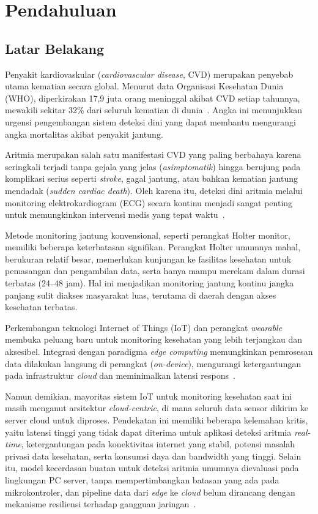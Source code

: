 \chapter{Pendahuluan}
\label{chap:pendahuluan}

\section{Latar Belakang}
\label{sec:latar-belakang}

Penyakit kardiovaskular (\textit{cardiovascular disease}, CVD) merupakan penyebab utama kematian secara global. Menurut data Organisasi Kesehatan Dunia (WHO), diperkirakan 17,9 juta orang meninggal akibat CVD setiap tahunnya, mewakili sekitar 32\% dari seluruh kematian di dunia~\cite{who_cvd}. Angka ini menunjukkan urgensi pengembangan sistem deteksi dini yang dapat membantu mengurangi angka mortalitas akibat penyakit jantung.

Aritmia merupakan salah satu manifestasi CVD yang paling berbahaya karena seringkali terjadi tanpa gejala yang jelas (\textit{asimptomatik}) hingga berujung pada komplikasi serius seperti \textit{stroke}, gagal jantung, atau bahkan kematian jantung mendadak (\textit{sudden cardiac death}). Oleh karena itu, deteksi dini aritmia melalui monitoring elektrokardiogram (ECG) secara kontinu menjadi sangat penting untuk memungkinkan intervensi medis yang tepat waktu~\cite{sheeba_rani_2026}.

Metode monitoring jantung konvensional, seperti perangkat Holter monitor, memiliki beberapa keterbatasan signifikan. Perangkat Holter umumnya mahal, berukuran relatif besar, memerlukan kunjungan ke fasilitas kesehatan untuk pemasangan dan pengambilan data, serta hanya mampu merekam dalam durasi terbatas (24--48 jam). Hal ini menjadikan monitoring jantung kontinu jangka panjang sulit diakses masyarakat luas, terutama di daerah dengan akses kesehatan terbatas.

Perkembangan teknologi Internet of Things (IoT) dan perangkat \textit{wearable} membuka peluang baru untuk monitoring kesehatan yang lebih terjangkau dan aksesibel. Integrasi dengan paradigma \textit{edge computing} memungkinkan pemrosesan data dilakukan langsung di perangkat (\textit{on-device}), mengurangi ketergantungan pada infrastruktur \textit{cloud} dan meminimalkan latensi respons~\cite{tinyml_iot_review}.

Namun demikian, mayoritas sistem IoT untuk monitoring kesehatan saat ini masih menganut arsitektur \textit{cloud-centric}, di mana seluruh data sensor dikirim ke server cloud untuk diproses. Pendekatan ini memiliki beberapa kelemahan kritis, yaitu latensi tinggi yang tidak dapat diterima untuk aplikasi deteksi aritmia \textit{real-time}, ketergantungan pada konektivitas internet yang stabil, potensi masalah privasi data kesehatan, serta konsumsi daya dan bandwidth yang tinggi. Selain itu, model kecerdasan buatan untuk deteksi aritmia umumnya dievaluasi pada lingkungan PC server, tanpa mempertimbangkan batasan yang ada pada mikrokontroler, dan pipeline data dari \textit{edge} ke \textit{cloud} belum dirancang dengan mekanisme resiliensi terhadap gangguan jaringan~\cite{resilient_edge_cloud}.

